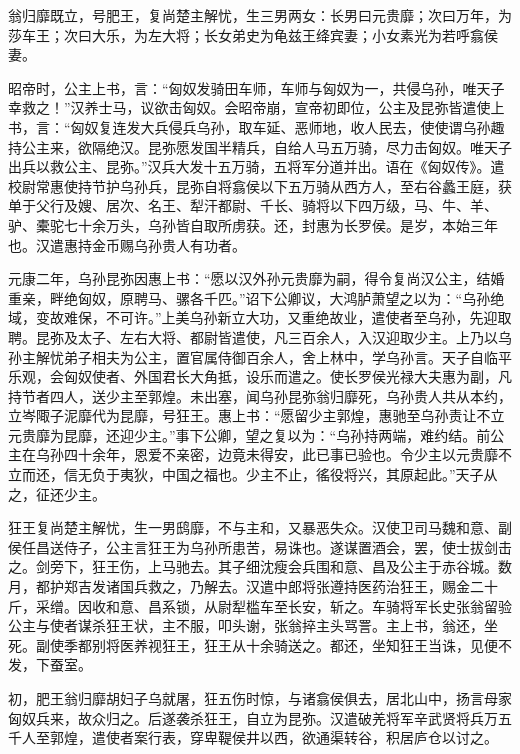 \documentclass[12pt,UTF8]{ctexbook}
\begin{document}
翁归靡既立，号肥王，复尚楚主解忧，生三男两女：长男曰元贵靡；次曰万年，为莎车王；次曰大乐，为左大将；长女弟史为龟兹王绛宾妻；小女素光为若呼翕侯妻。



昭帝时，公主上书，言：“匈奴发骑田车师，车师与匈奴为一，共侵乌孙，唯天子幸救之！”汉养士马，议欲击匈奴。会昭帝崩，宣帝初即位，公主及昆弥皆遣使上书，言：“匈奴复连发大兵侵兵乌孙，取车延、恶师地，收人民去，使使谓乌孙趣持公主来，欲隔绝汉。昆弥愿发国半精兵，自给人马五万骑，尽力击匈奴。唯天子出兵以救公主、昆弥。”汉兵大发十五万骑，五将军分道并出。语在《匈奴传》。遣校尉常惠使持节护乌孙兵，昆弥自将翕侯以下五万骑从西方人，至右谷蠡王庭，获单于父行及嫂、居次、名王、犁汗都尉、千长、骑将以下四万级，马、牛、羊、驴、橐驼七十余万头，乌孙皆自取所虏获。还，封惠为长罗侯。是岁，本始三年也。汉遣惠持金币赐乌孙贵人有功者。



元康二年，乌孙昆弥因惠上书：“愿以汉外孙元贵靡为嗣，得令复尚汉公主，结婚重亲，畔绝匈奴，原聘马、骡各千匹。”诏下公卿议，大鸿胪萧望之以为：“乌孙绝域，变故难保，不可许。”上美乌孙新立大功，又重绝故业，遣使者至乌孙，先迎取聘。昆弥及太子、左右大将、都尉皆遣使，凡三百余人，入汉迎取少主。上乃以乌孙主解忧弟子相夫为公主，置官属侍御百余人，舍上林中，学乌孙言。天子自临平乐观，会匈奴使者、外国君长大角抵，设乐而遣之。使长罗侯光禄大夫惠为副，凡持节者四人，送少主至郭煌。未出塞，闻乌孙昆弥翁归靡死，乌孙贵人共从本约，立岑陬子泥靡代为昆靡，号狂王。惠上书：“愿留少主郭煌，惠驰至乌孙责让不立元贵靡为昆靡，还迎少主。”事下公卿，望之复以为：“乌孙持两端，难约结。前公主在乌孙四十余年，恩爱不亲密，边竟未得安，此已事已验也。令少主以元贵靡不立而还，信无负于夷狄，中国之福也。少主不止，徭役将兴，其原起此。”天子从之，征还少主。



狂王复尚楚主解忧，生一男鸱靡，不与主和，又暴恶失众。汉使卫司马魏和意、副侯任昌送侍子，公主言狂王为乌孙所患苦，易诛也。遂谋置酒会，罢，使士拔剑击之。剑旁下，狂王伤，上马驰去。其子细沈瘦会兵围和意、昌及公主于赤谷城。数月，都护郑吉发诸国兵救之，乃解去。汉遣中郎将张遵持医药治狂王，赐金二十斤，采缯。因收和意、昌系锁，从尉犁槛车至长安，斩之。车骑将军长史张翁留验公主与使者谋杀狂王状，主不服，叩头谢，张翁捽主头骂詈。主上书，翁还，坐死。副使季都别将医养视狂王，狂王从十余骑送之。都还，坐知狂王当诛，见便不发，下蚕室。



初，肥王翁归靡胡妇子乌就屠，狂五伤时惊，与诸翕侯俱去，居北山中，扬言母家匈奴兵来，故众归之。后遂袭杀狂王，自立为昆弥。汉遣破羌将军辛武贤将兵万五千人至郭煌，遣使者案行表，穿卑鞮侯井以西，欲通渠转谷，积居庐仓以讨之。
\end{document}
